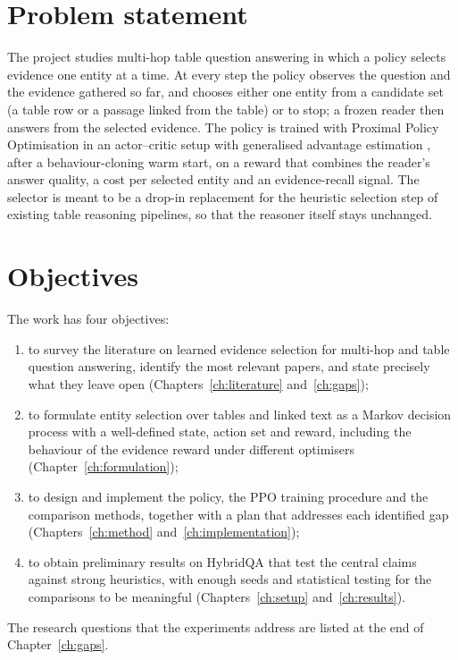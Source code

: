 \section{Problem statement}

The project studies multi-hop table question answering in which a policy selects evidence one entity at a time. At every step the policy observes the question and the evidence gathered so far, and chooses either one entity from a candidate set (a table row or a passage linked from the table) or to stop; a frozen reader then answers from the selected evidence. The policy is trained with Proximal Policy Optimisation \citep{schulman2017ppo} in an actor--critic setup with generalised advantage estimation \citep{schulman2016gae}, after a behaviour-cloning warm start, on a reward that combines the reader's answer quality, a cost per selected entity and an evidence-recall signal. The selector is meant to be a drop-in replacement for the heuristic selection step of existing table reasoning pipelines, so that the reasoner itself stays unchanged.

\section{Objectives}

The work has four objectives:
\begin{enumerate}
  \item to survey the literature on learned evidence selection for multi-hop and table question answering, identify the most relevant papers, and state precisely what they leave open (Chapters~\ref{ch:literature} and~\ref{ch:gaps});
  \item to formulate entity selection over tables and linked text as a Markov decision process with a well-defined state, action set and reward, including the behaviour of the evidence reward under different optimisers (Chapter~\ref{ch:formulation});
  \item to design and implement the policy, the PPO training procedure and the comparison methods, together with a plan that addresses each identified gap (Chapters~\ref{ch:method} and~\ref{ch:implementation});
  \item to obtain preliminary results on HybridQA that test the central claims against strong heuristics, with enough seeds and statistical testing for the comparisons to be meaningful (Chapters~\ref{ch:setup} and~\ref{ch:results}).
\end{enumerate}
The research questions that the experiments address are listed at the end of Chapter~\ref{ch:gaps}.

